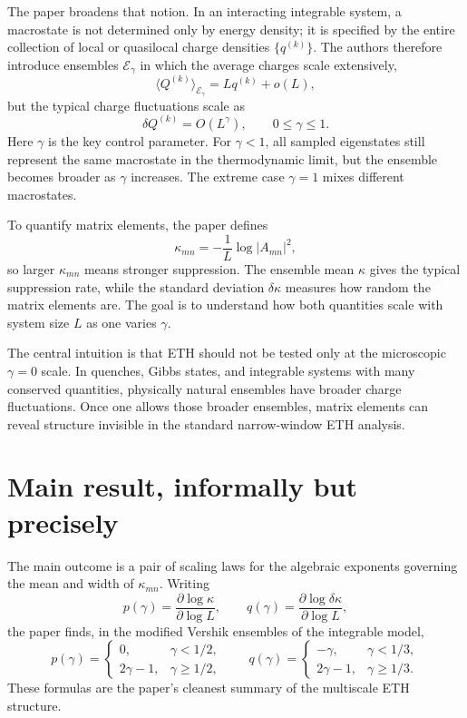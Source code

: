 \documentclass[11pt]{article}
\begin{document}
The paper broadens that notion. In an interacting integrable system, a macrostate is not determined only by energy density; it is specified by the entire collection of local or quasilocal charge densities $\{q^{(k)}\}$. The authors therefore introduce ensembles $\mathcal E_\gamma$ in which the average charges scale extensively,
\[
\langle Q^{(k)}\rangle_{\mathcal E_\gamma}=Lq^{(k)}+o(L),
\]
but the typical charge fluctuations scale as
\[
\delta Q^{(k)}=O(L^\gamma), \qquad 0\le \gamma\le 1.
\]
Here $\gamma$ is the key control parameter. For $\gamma<1$, all sampled eigenstates still represent the same macrostate in the thermodynamic limit, but the ensemble becomes broader as $\gamma$ increases. The extreme case $\gamma=1$ mixes different macrostates.

To quantify matrix elements, the paper defines
\[
\kappa_{mn}= -\frac{1}{L}\log |A_{mn}|^2,
\]
so larger $\kappa_{mn}$ means stronger suppression. The ensemble mean $\kappa$ gives the typical suppression rate, while the standard deviation $\delta\kappa$ measures how random the matrix elements are. The goal is to understand how both quantities scale with system size $L$ as one varies $\gamma$.

The central intuition is that ETH should not be tested only at the microscopic $\gamma=0$ scale. In quenches, Gibbs states, and integrable systems with many conserved quantities, physically natural ensembles have broader charge fluctuations. Once one allows those broader ensembles, matrix elements can reveal structure invisible in the standard narrow-window ETH analysis.

\section*{Main result, informally but precisely}
The main outcome is a pair of scaling laws for the algebraic exponents governing the mean and width of $\kappa_{mn}$. Writing
\[
p(\gamma)=\frac{\partial \log \kappa}{\partial \log L}, \qquad q(\gamma)=\frac{\partial \log \delta\kappa}{\partial \log L},
\]
the paper finds, in the modified Vershik ensembles of the integrable model,
\[
p(\gamma)=
\begin{cases}
0, & \gamma<1/2,\\
2\gamma-1, & \gamma\ge 1/2,
\end{cases}
\qquad
q(\gamma)=
\begin{cases}
-\gamma, & \gamma<1/3,\\
2\gamma-1, & \gamma\ge 1/3.
\end{cases}
\]
These formulas are the paper's cleanest summary of the multiscale ETH structure.
\end{document}
